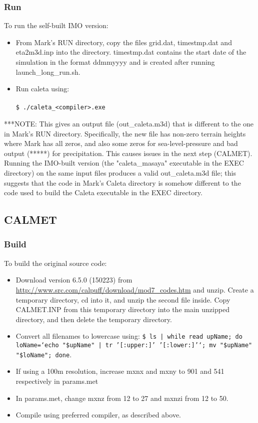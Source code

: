 \documentclass[10pt,a4paper]{article}
\newcommand\tab[1][0.5cm]{\hspace*{#1}}
\begin{document}
\subsubsection{Run}
To run the self-built IMO version:
\begin{itemize}
\item From Mark's RUN directory, copy the files grid.dat, timestmp.dat and eta2m3d.inp into the directory. timestmp.dat contains the start date of the simulation in the format ddmmyyyy and is created after running launch\_long\_run.sh. 
\item Run caleta using:\\\\
\tab \texttt{\$ ./caleta\_<compiler>.exe}
\end{itemize}
***NOTE: This gives an output file (out\_caleta.m3d) that is different to the one in Mark's RUN directory. Specifically, the new file has non-zero terrain heights where Mark has all zeros, and also some zeros for sea-level-pressure and bad output (*****) for precipitation. This causes issues in the next step (CALMET). Running the IMO-built version (the "caleta\_masaya" executable in the EXEC directory) on the same input files produces a valid out\_caleta.m3d file; this suggests that the code in Mark's Caleta directory is somehow different to the code used to build the Caleta executable in the EXEC directory.

\subsection{CALMET}
\subsubsection{Build}
To build the original source code:
\begin{itemize}
\item Download version 6.5.0 (150223) from \url{http://www.src.com/calpuff/download/mod7_codes.htm} and unzip. Create a temporary directory, cd into it, and unzip the second file inside. Copy CALMET.INP from this temporary directory into the main unzipped directory, and then delete the temporary directory.
\item Convert all filenames to lowercase using: \texttt{\$ ls | while read upName; do loName=`echo "\${upName}" | tr '[:upper:]' '[:lower:]'`; mv "\$upName" "\$loName"; done}.
\item If using a 100m resolution, increase mxnx and mxny to 901 and 541 respectively in params.met
\item In params.met, change mxnz from 12 to 27 and mxnzi from 12 to 50.
\item Compile using preferred compiler, as described above.
\end{itemize}
\end{document}
